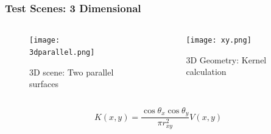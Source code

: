        \begin{frame}\frametitle{Test Scenes: 3 Dimensional}
       \vspace{-0.5 cm}
          \begin{columns}[T]
            \begin{column}{.4\textwidth}
        
                \begin{figure}
                \centering
                \texttt{[image: 3dparallel.png]}
                \centering
                \caption{3D scene: Two parallel surfaces}
                \label{fig_parallel_3D}
                \end{figure}
                

            \end{column}
          \begin{column}{.5\textwidth}

                \begin{figure}
                \centering
                \texttt{[image: xy.png]}
                \caption{3D Geometry: Kernel calculation}
                \label{fig_xy}
                \end{figure}
          \end{column}
        \end{columns}

          \begin{equation} \label{eq:3dkernel}
          K(x,y) =  \frac{\cos \theta_x \cos \theta_y} {\pi r_{xy}^{2}} V(x,y) 
          \end{equation}
          
     
        \end{frame}



